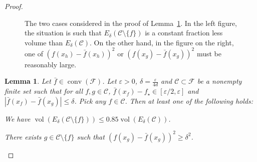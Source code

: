 \documentclass[letter, 12pt]{report}
\newcommand{\cC}{\mathcal C}
\newcommand{\sF}{\mathscr F}
\newcommand{\vol}{\operatorname{vol}}
\newcommand{\conv}{\operatorname{conv}}
\newcommand{\1}{\mathbf{1}}
\renewcommand{\epsilon}{\varepsilon}
\theoremstyle{plain}
\newtheorem{lemma}[theorem]{Lemma}
\theoremstyle{definition}
\theoremstyle{remark}
\begin{document}
\begin{proof}
\begin{figure}[h!]
\begin{tikzpicture}[scale=0.75]
        \end{tikzpicture}

        \caption{The two cases considered in the proof of Lemma~\ref{lem:ridge-ir-1}.
            In the left figure, the situation is such that $E_\delta(\cC \setminus \{f\})$ is a constant fraction less volume than $E_\delta(\cC)$.
            On the other hand, in the figure on the right, one of $(f(x_h) - \bar f(x_h))^2$ or $(f(x_g) - \bar f(x_g))^2$ must be reasonably large.}
        \label{fig:ir-ridge}
    \end{figure}

    \FloatBarrier
    \begin{lemma}\label{lem:ridge-ir-1}
        Let $\bar{f} \in \conv(\sF)$.
        Let $\epsilon > 0$, $\delta = \frac{\epsilon}{4d}$ and $\cC \subset \sF$ be a nonempty finite set such that for all $f, g \in \cC$,
        $\bar f(x_f) - f_\star \in [\epsilon/2, \epsilon]$ and
        $|\bar f(x_f) - \bar f(x_g)| \leq \delta$.
        Pick any $f \in \cC$.
        Then at least one of the following holds:
        \begin{enumroman}
            \item We have $\vol(E_\delta(\cC \setminus \{f\})) \leq 0.85 \vol(E_\delta(\cC))$. \label{lem:ridge-ir-1:a}
            \item There exists $g \in \cC\setminus\{f\}$ such that $(f(x_g) - \bar f(x_g))^2 \geq \delta^2$. \label{lem:ridge-ir-1:b}
        \end{enumroman}
    \end{lemma}


\end{proof}
\end{document}
